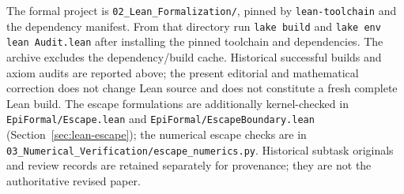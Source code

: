 \documentclass[11pt]{amsart}
\theoremstyle{definition}
\theoremstyle{remark}
\numberwithin{equation}{section}
\begin{document}
The formal project is \texttt{02\_\allowbreak{}Lean\_\allowbreak{}Formalization/\allowbreak{}}, pinned by \texttt{lean-toolchain} and the dependency manifest. From that directory run \texttt{lake build} and \texttt{lake env lean Audit.lean} after installing the pinned toolchain and dependencies. The archive excludes the dependency/build cache. Historical successful builds and axiom audits are reported above; the present editorial and mathematical correction does not change Lean source and does not constitute a fresh complete Lean build. The escape formulations are additionally kernel-checked in \texttt{EpiFormal/Escape.lean} and \texttt{EpiFormal/EscapeBoundary.lean} (Section~\ref{sec:lean-escape}); the numerical escape checks are in \texttt{03\_\allowbreak{}Numerical\_\allowbreak{}Verification/\allowbreak{}escape\_\allowbreak{}numerics.py}. Historical subtask originals and review records are retained separately for provenance; they are not the authoritative revised paper.
\end{document}

